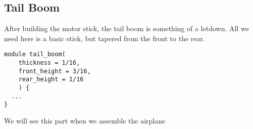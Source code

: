 \subsection{Tail Boom}

After building the motor stick, the tail boom is something of a letdown. All we
need here is a basic stick, but tapered from the front to the rear.

\begin{lstlisting}
module tail_boom(
	thickness = 1/16,
	front_height = 3/16,
	rear_height = 1/16
	) {
  ...
}
\end{lstlisting}

We will see this part when we assemble the airplane
